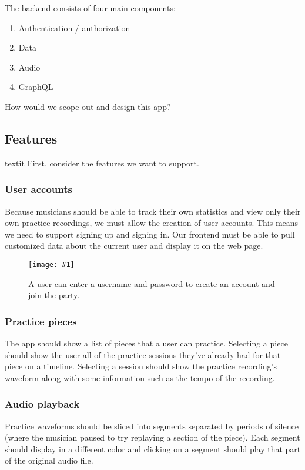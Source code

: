 \documentclass{article}
\newcommand{\screenshot}[2]{
  \begin{figure}[h]
    \texttt{[image: \#1]}
    \caption*{#2}
  \end{figure}
}
\begin{document}
The backend consists of four main components:

\begin{enumerate}
  \item Authentication / authorization
  \item Data
  \item Audio
  \item GraphQL
\end{enumerate}

How would we scope out and design this app?

\subsection{Features}
textit
First, consider the features we want to support.

\subsubsection{User accounts}

Because musicians should be able to track their own statistics and view only their own practice recordings, we must allow the creation of user accounts.
This means we need to support signing up and signing in.
Our frontend must be able to pull customized data about the current user and display it on the web page.

\screenshot{jong-signup}{A user can enter a username and password to create an account and join the party.}

\subsubsection{Practice pieces}

The app should show a list of pieces that a user can practice.
Selecting a piece should show the user all of the practice sessions they've already had for that piece on a timeline.
Selecting a session should show the practice recording's waveform along with some information such as the tempo of the recording.

\subsubsection{Audio playback}

Practice waveforms should be sliced into segments separated by periods of silence (where the musician paused to try replaying a section of the piece).
Each segment should display in a different color and clicking on a segment should play that part of the original audio file.
\end{document}
